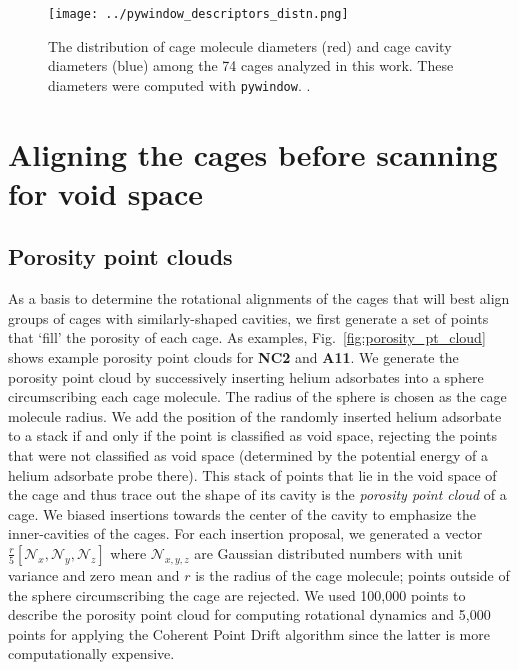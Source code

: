 \documentclass[journal=jacsat,manuscript=article]{achemso}
\begin{document}
\begin{figure}
\centering
	\texttt{[image: ../pywindow\_descriptors\_distn.png]}
	\caption{The distribution of cage molecule diameters (red) and cage cavity diameters (blue) among the 74 cages analyzed in this work. These diameters were computed with \texttt{pywindow}. \cite{miklitz2018pywindow}.
	} \label{fig:pywindow_descriptors_distn}
\end{figure}

\newpage
\clearpage

\section{Aligning the cages before scanning for void space} 

{\color{red}
\subsection{Porosity point clouds}
\label{sec:porosity_pt_cld}
As a basis to determine the rotational alignments of the cages that will best align groups of cages with similarly-shaped cavities, we first generate a set of points that `fill' the porosity of each cage. As examples, Fig.~\ref{fig:porosity_pt_cloud} shows example porosity point clouds for \textbf{NC2} and \textbf{A11}. We generate the porosity point cloud by successively inserting helium adsorbates into a sphere circumscribing each cage molecule. The radius of the sphere is chosen as the cage molecule radius. We add the position of the randomly inserted helium adsorbate to a stack if and only if the point is classified as void space, rejecting the points that were not classified as void space (determined by the potential energy of a helium adsorbate probe there). This stack of points that lie in the void space of the cage and thus trace out the shape of its cavity is the \emph{porosity point cloud} of a cage. We biased insertions towards the center of the cavity to emphasize the inner-cavities of the cages. For each insertion proposal, we generated a vector $\frac{r}{5}[\mathcal{N}_x,\mathcal{N}_y,\mathcal{N}_z]$ where $\mathcal{N}_{x,y,z}$ are Gaussian distributed numbers with unit variance and zero mean and $r$ is the radius of the cage molecule; points outside of the sphere circumscribing the cage are rejected. We used 100,000 points to describe the porosity point cloud for computing rotational dynamics and 5,000 points for applying the Coherent Point Drift algorithm since the latter is more computationally expensive.

}
\end{document}
